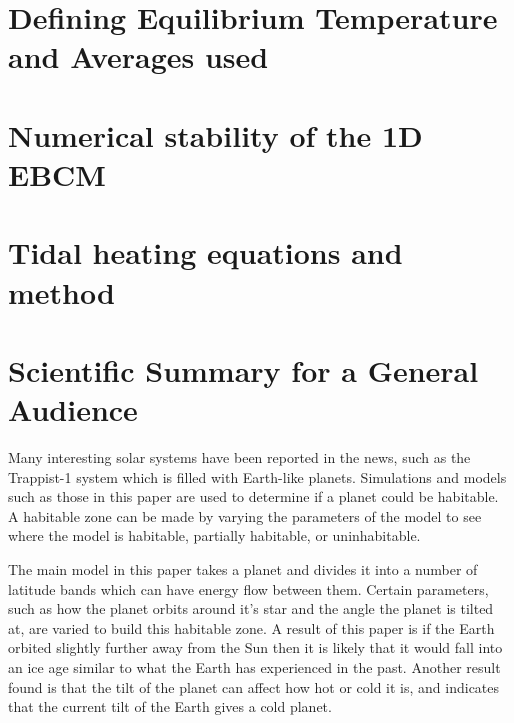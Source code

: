\documentclass[12pt, onecolumn]{revtex4-2}    %
\begin{document}




\clearpage

\appendix

\section{Defining Equilibrium Temperature and Averages used} \label{appx:EquilTempAverages}

\section{Numerical stability of the 1D EBCM} \label{appx:NumStability}

\section{Tidal heating equations and method} \label{appx:TidalHeatingEquationsMethod}

\clearpage

\section*{Scientific Summary for a General Audience}

Many interesting solar systems have been reported in the news, such as the Trappist-1 system which is filled with Earth-like planets.
Simulations and models such as those in this paper are used to determine if a planet could be habitable.
A habitable zone can be made by varying the parameters of the model to see where the model is habitable, partially habitable, or uninhabitable.

The main model in this paper takes a planet and divides it into a number of latitude bands which can have energy flow between them.
Certain parameters, such as how the planet orbits around it's star and the angle the planet is tilted at, are varied to build this habitable zone.
A result of this paper is if the Earth orbited slightly further away from the Sun then it is likely that it would fall into an ice age similar to what the Earth has experienced in the past.
Another result found is that the tilt of the planet can affect how hot or cold it is, and indicates that the current tilt of the Earth gives a cold planet.
\end{document}
